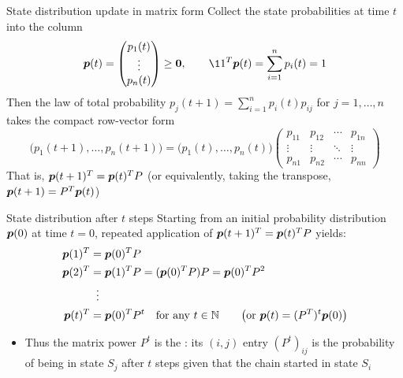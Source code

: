 \documentclass[aspectratio=169]{beamer}\usepackage[]{graphicx}\usepackage[]{xcolor}
\begin{document}
\begin{frame}{State distribution update in matrix form}
Collect the state probabilities at time $t$ into the column 
\[
\bp(t) = \begin{pmatrix} p_1(t) \\ \vdots \\ p_n(t) \end{pmatrix} \ge \b0, \qquad \11^T \bp(t) = \sum_{i=1}^n p_i(t) = 1
\]
\vfill
Then the law of total probability $p_j(t+1) = \sum_{i=1}^n p_i(t) p_{ij}$ for $j = 1, \ldots, n$ takes the compact row-vector form
\[
\bigl(p_1(t+1), \ldots, p_n(t+1)\bigr)
=
\bigl(p_1(t), \ldots, p_n(t)\bigr)
\begin{pmatrix}
p_{11} & p_{12} & \cdots & p_{1n} \\
\vdots & \vdots & \ddots & \vdots \\
p_{n1} & p_{n2} & \cdots & p_{nn}
\end{pmatrix}
\]
That is, $\bm{p}(t+1)^T = \bm{p}(t)^T P$ (or equivalently, taking the transpose, $\bm{p}(t+1) = P^T\bm{p}(t)$)
\end{frame}

\begin{frame}{State distribution after $t$ steps}
Starting from an initial probability distribution $\bm{p}(0)$ at time $t = 0$, repeated application of $\bm{p}(t+1)^T = \bm{p}(t)^T P$ yields:
\begin{align*}
\bm{p}(1)^T &= \bm{p}(0)^T P \\
\bm{p}(2)^T &= \bm{p}(1)^T P = (\bm{p}(0)^T P) P = \bm{p}(0)^T P^2 \\
&\;\;\vdots \\
\bm{p}(t)^T &= \bm{p}(0)^T P^t \quad \text{for any } t \in \mathbb{N} \qquad \bigl(\text{or } \bm{p}(t) = (P^T)^t \bm{p}(0)\bigr)
\end{align*}
\vfill
\begin{itemize}
\item Thus the matrix power $P^t$ is the : its $(i, j)$ entry $(P^t)_{ij}$ is the probability of being in state $S_j$ after $t$ steps given that the chain started in state $S_i$
\end{itemize}
\end{frame}
\end{document}
